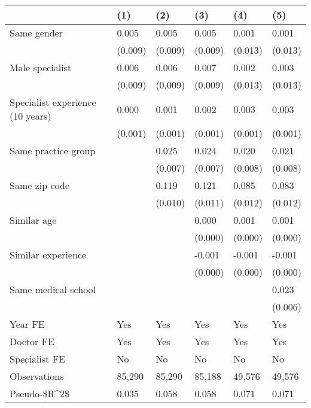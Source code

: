 \begin{tabular}{llllll}
\hline
& (1) & (2) & (3) & (4) & (5) \\ \hline
Same gender                        & 0.005   & 0.005   & 0.005   & 0.001   & 0.001   \\
& (0.009) & (0.009) & (0.009) & (0.013) & (0.013) \\
Male specialist                    & 0.006   & 0.006   & 0.007   & 0.002   & 0.003   \\
& (0.009) & (0.009) & (0.009) & (0.013) & (0.013) \\
Specialist experience (10 years)   & 0.000   & 0.001   & 0.002   & 0.003   & 0.003   \\
& (0.001) & (0.001) & (0.001) & (0.001) & (0.001) \\
Same practice group                &         & 0.025   & 0.024   & 0.020   & 0.021   \\
&         & (0.007) & (0.007) & (0.008) & (0.008) \\
Same zip code                      &         & 0.119   & 0.121   & 0.085   & 0.083   \\
&         & (0.010) & (0.011) & (0.012) & (0.012) \\
Similar age                        &         &         & 0.000   & 0.001   & 0.001   \\
&         &         & (0.000) & (0.000) & (0.000) \\
Similar experience                 &         &         & -0.001  & -0.001  & -0.001  \\
&         &         & (0.000) & (0.000) & (0.000) \\
Same medical school                &         &         &         &         & 0.023   \\
&         &         &         &         & (0.006) \\
Year FE                            & Yes     & Yes     & Yes     & Yes     & Yes     \\
Doctor FE                          & Yes     & Yes     & Yes     & Yes     & Yes     \\
Specialist FE                      & No      & No      & No      & No      & No      \\
Observations                       & 85,290  & 85,290  & 85,188  & 49,576  & 49,576  \\
Pseudo-\$R\textasciicircum{}2\$ & 0.035   & 0.058   & 0.058   & 0.071   & 0.071   \\
\hline
\end{tabular}
